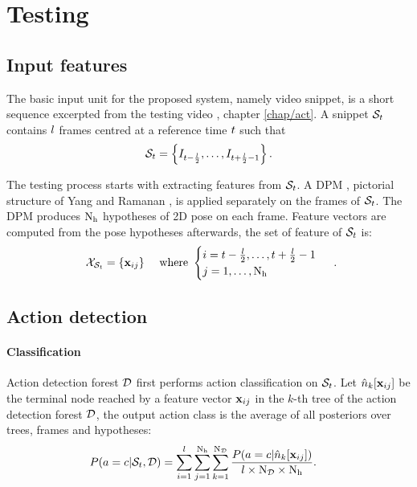 \section{Testing}

\subsection{Input features}

The basic input unit for the proposed system, namely video snippet, is a short sequence excerpted from the testing video \cite{Schindler2008}, \cf chapter \ref{chap/act}. A snippet $\mathcal{S}_{t}$ contains $l$ frames centred at a reference time $t$ such that
\begin{equation}
	\label{eqn/body/snippetnow}
	\mathcal{S}_{t} = \left\{ I_{t - \frac{l}{2}}, \dots, I_{t + \frac{l}{2} - 1} \right\}.
\end{equation}

The testing process starts with extracting features from $\mathcal{S}_{t}$. A DPM , \eg pictorial structure of Yang and Ramanan \cite{Yang2011}, is applied separately on the frames of $\mathcal{S}_{t}$. The DPM produces $\mathrm{N_{h}}$ hypotheses of 2D pose on each frame. Feature vectors are computed from the pose hypotheses afterwards, the set of feature of $\mathcal{S}_{t}$ is:
\begin{equation}
	\begin{array}{lr}
		\mathcal{X}_{\mathcal{S}_{t}} = \{ \mathbf{x}_{ij}\} & \mbox{ where } 
		\begin{cases}
			i =t-\frac{l}{2},\dots,t+\frac{l}{2}-1 \\ 
			j=1,\dots,\mathrm{N_{h}}
		\end{cases}
	\end{array}.
\end{equation} 

\subsection{Action detection} 

\paragraph{Classification}
Action detection forest $\mathcal{D}$ first performs action classification on $\mathcal{S}_{t}$. Let ${\hat{n}}_k[\mathbf{x}_{ij}]$ be the terminal node reached by a feature vector $\mathbf{x}_{ij}$ in the $k$-th tree of the action detection forest $\mathcal{D}$, the output action class is the average of all posteriors over trees, frames and hypotheses:   
\begin{equation}
	\label{eqn/body/actionclassification} 
	\begin{aligned}
	P(a & = c | \mathcal{S}_{t}, \mathcal{D}) = \displaystyle \sum_{i = 1}^{l} \sum_{j = 1}^{\mathrm{N_{h}}} \sum_{k = 1}^{\mathrm{N_{\mathcal{D}}}} \frac {P(a=c|{\hat{n}}_{k}[\mathbf{x}_{ij}])} {l\times\mathrm{N_{\mathcal{D}}}\times\mathrm{N_{h}}}.
	\end{aligned}
\end{equation}


